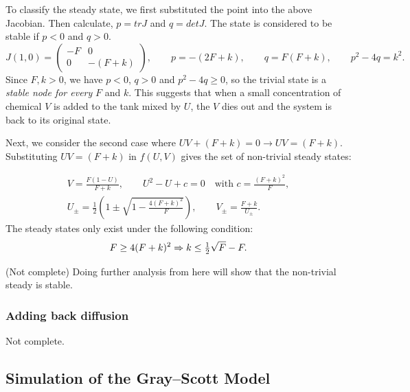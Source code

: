 \documentclass[a4paper, 11pt]{article}
\begin{document}
To classify the steady state, we first substituted the point into the above Jacobian. Then calculate, $p = tr J$ and $q = det J$. The state is considered to be stable if $p < 0$ and $q > 0$.
\begin{equation}
	\label{eq:gs-jacobian-trivial}
	J(1, 0) =
	\begin{pmatrix}
		-F & 0        \\
		0  & -(F + k)
	\end{pmatrix},
	\qquad p = -(2F + k), \qquad q = F(F + k), \qquad p^2 - 4q = k^2 .
\end{equation}
Since $F, k > 0$, we have $p < 0$, $q > 0$ and $p^2 - 4q \geq 0$, so the trivial state is a \emph{stable node for every} $F$ and $k$. This suggests that when a small concentration of chemical $V$  is added to the tank mixed by $U$, the $V$ dies out and the system is back to its original state.

Next, we consider the second case where $UV + (F + k) = 0 \rightarrow UV = (F + k)$. Substituting $UV = (F + k)$ in $f(U,V)$ gives the set of non-trivial steady states:

\begin{equation}
	\label{eq:gs-nontrivial}
	\begin{gathered}
		V = \frac{F(1 - U)}{F + k}, \qquad
		U^2 - U + c = 0 \quad \text{with } c = \frac{(F + k)^2}{F}, \\[4pt]
		U_\pm = \frac{1}{2}\left(1 \pm \sqrt{1 - \frac{4(F + k)^2}{F}}\right), \qquad
		V_\pm = \frac{F + k}{U_\pm}.
	\end{gathered}
\end{equation}
The steady states only exist under the following condition:
\begin{equation}
	\label{eq:saddle-node}
	F \ge 4(F + k)^2 \Rightarrow k \leq \tfrac{1}{2}\sqrt{F} - F .
\end{equation}

(Not complete) Doing further analysis from here will show that the non-trivial steady is stable.  

\subsubsection*{Adding back diffusion}
Not complete. 


\subsection{Simulation of the Gray--Scott Model} 
\end{document}
